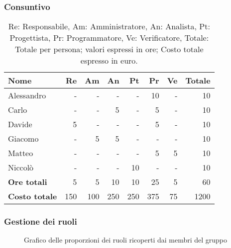\subsubsection{Consuntivo}

\begin{table}[H]
	\centering
	\begin{tabular}{l|r|r|r|r|r|r|r}
		\textbf{Nome}         & \textbf{Re} & \textbf{Am} & \textbf{An} & \textbf{Pt} & \textbf{Pr} & \textbf{Ve} & \textbf{Totale} \\
		\hline
		Alessandro            & -           & -           & -           & -           & 10          & -           & 10              \\
		Carlo                 & -           & -           & 5           & -           & 5           & -           & 10              \\
		Davide                & 5           & -           & -           & -           & 5           & -           & 10              \\
		Giacomo               & -           & 5           & 5           & -           & -           & -           & 10              \\
		Matteo                & -           & -           & -           & -           & 5           & 5           & 10              \\
		Niccolò               & -           & -           & -           & 10          & -           & -           & 10              \\
		\hline
		\textbf{Ore totali}   & 5           & 5           & 10          & 10          & 25          & 5           & 60              \\
		\textbf{Costo totale} & 150         & 100         & 250         & 250         & 375         & 75          & 1200
	\end{tabular}
	\caption{Re: Responsabile, Am: Amministratore, An: Analista, Pt: Progettista,
		Pr: Programmatore, Ve: Verificatore, Totale: Totale per persona; valori espressi in ore; Costo totale espresso in euro.}
\end{table}

\subsubsection{Gestione dei ruoli}

\begin{figure}[h]
	\centering
    \caption{Grafico delle proporzioni dei ruoli ricoperti dai membri del gruppo}
\end{figure}

